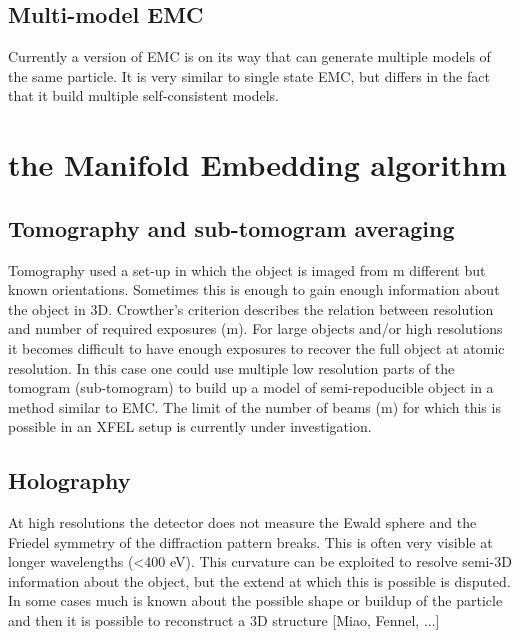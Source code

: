 \subsection{Multi-model EMC}
Currently a version of EMC is on its way that can generate multiple models of the same particle. It is very similar to single state EMC, but differs in the fact that it build multiple self-consistent models. 

\section{the Manifold Embedding algorithm}


\subsection{Tomography and sub-tomogram averaging}
Tomography used a set-up in which the object is imaged from m different but known orientations. Sometimes this is enough to gain enough information about the object in 3D. Crowther's criterion describes the relation between resolution and number of required exposures (m). For large objects and/or high resolutions it becomes difficult to have enough exposures to recover the full object at atomic resolution. In this case one could use multiple low resolution parts of the tomogram (sub-tomogram) to build up a model of semi-repoducible object in a method similar to EMC. The limit of the number of beams (m) for which this is possible in an XFEL setup is currently under investigation.

\subsection{Holography}
At high resolutions the detector does not measure the Ewald sphere and the Friedel symmetry of the diffraction pattern breaks. This is often very visible at longer wavelengths (<400 eV). This curvature can be exploited to resolve semi-3D information about the object, but the extend at which this is possible is disputed. In some cases much is known about the possible shape or buildup of the particle and then it is possible to reconstruct a 3D structure [Miao, Fennel, ...]

